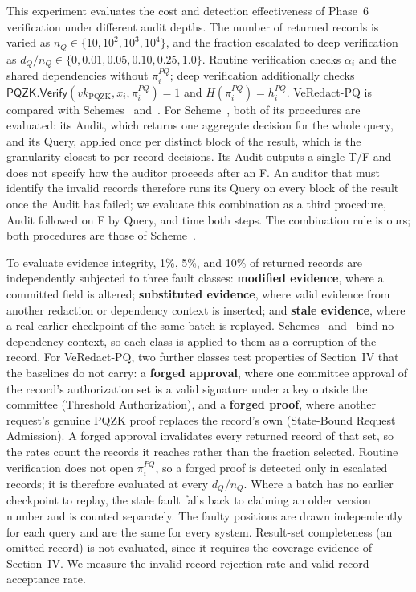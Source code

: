 \documentclass[lettersize,journal]{IEEEtran}
\begin{document}
This experiment evaluates the cost and detection effectiveness of
Phase~6 verification under different audit depths. The number of
returned records is varied as $n_Q\in\{10,10^2,10^3,10^4\}$, and the
fraction escalated to deep verification as
$d_Q/n_Q\in\{0,0.01,0.05,0.10,0.25,1.0\}$.
\textcolor{e4}{Routine verification checks $\alpha_i$ and the shared
dependencies without $\pi_i^{PQ}$; deep verification additionally checks
$\mathsf{PQZK.Verify}(vk_{\mathrm{PQZK}},x_i,\pi_i^{PQ})=1$ and
$H(\pi_i^{PQ})=h_i^{PQ}$.} VeRedact-PQ is compared with
Schemes~\cite{ref1} and~\cite{ref13}\textcolor{e4}{. For
Scheme~\cite{ref13}, both of its procedures are evaluated: its Audit,
which returns one aggregate decision for the whole query, and its Query,
applied once per distinct block of the result, which is the granularity
closest to per-record decisions.} \textcolor{e4}{Its Audit outputs a
single T/F and does not specify how the auditor proceeds after an F. An
auditor that must identify the invalid records therefore runs its Query
on every block of the result once the Audit has failed; we evaluate this
combination as a third procedure, Audit followed on F by Query, and time
both steps. The combination rule is ours; both procedures are those of
Scheme~\cite{ref13}.}

To evaluate evidence integrity, \textcolor{e4}{1\%, 5\%, and 10\%} of returned
records are independently subjected to three fault classes:
\textbf{modified evidence}, where a committed field is altered;
\textbf{substituted evidence}, where \textcolor{e4}{valid} evidence
from another redaction or dependency context is inserted; and
\textbf{stale evidence}, where \textcolor{e4}{a real earlier checkpoint
of the same batch} is replayed. \textcolor{e4}{Schemes~\cite{ref1}
and~\cite{ref13} bind no dependency context, so each class is applied
to them as a corruption of the record. For VeRedact-PQ, two further
classes test properties of Section~IV that the baselines do not carry:
a \textbf{forged approval}, where one committee approval of the
record's authorization set is a valid signature under a key outside the
committee (Threshold Authorization), and a \textbf{forged proof}, where
another request's genuine PQZK proof replaces the record's own
(State-Bound Request Admission). A forged approval invalidates every
returned record of that set, so the rates count the records it reaches
rather than the fraction selected. Routine verification does not open
$\pi_i^{PQ}$, so a forged proof is detected only in escalated records;
it is therefore evaluated at every $d_Q/n_Q$. Where a batch has no
earlier checkpoint to replay, the stale fault falls back to claiming an
older version number and is counted separately. The faulty positions are
drawn independently for each query and are the same for every system.
Result-set completeness (an omitted record) is not evaluated, since it
requires the coverage evidence of Section~IV.} We measure the
invalid-record rejection rate and valid-record acceptance rate.
\end{document}

